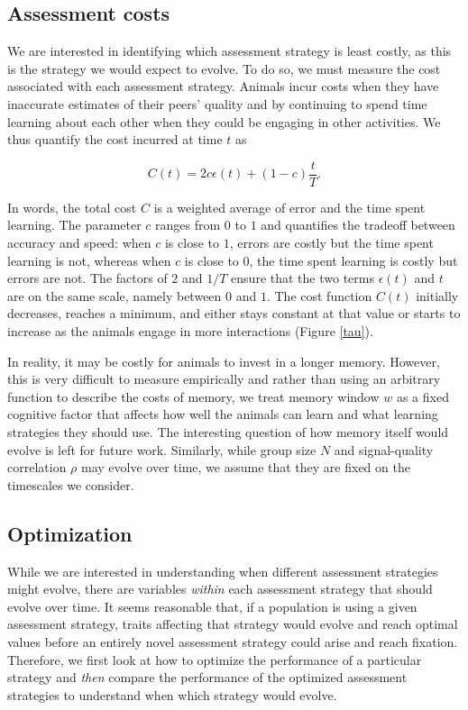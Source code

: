 \subsection{Assessment costs }
We are interested in identifying which assessment strategy is least costly, as this is the strategy we would expect to evolve. To do so, we must measure the cost associated with each assessment strategy. Animals incur costs when they have inaccurate estimates of their peers' quality and by continuing to spend time learning about each other when they could be engaging in other activities. We thus quantify the cost incurred at time $t$ as 
\begin{linenomath*}
\begin{equation*}
C(t) = 2c\epsilon(t) +(1-c)\frac{t}{T}.
\end{equation*}  
\end{linenomath*}
In words, the total cost $C$ is a weighted average of error and the time spent learning. The parameter $c$ ranges from $0$ to $1$ and quantifies the tradeoff between accuracy and speed: when $c$ is close to $1$, errors are costly but the time spent learning is not, whereas when $c$ is close to $0$, the time spent learning is costly but errors are not. The factors of $2$ and $1/T$ ensure that the two terms $\epsilon(t)$ and $t$ are on the same scale, namely between $0$ and $1$. 
The cost function $C(t)$ initially decreases, reaches a minimum, and either stays constant at that value or starts to increase as the animals engage in more interactions (Figure \ref{tau}). 

In reality, it may be costly for animals to invest in a longer memory. However, this is very difficult to measure empirically and rather than using an arbitrary function to describe the costs of memory, we treat memory window $w$ as a fixed cognitive factor that affects how well the animals can learn and what learning strategies they should use. The interesting question of how memory itself would evolve is left for future work. Similarly, while group size $N$ and signal-quality correlation $\rho$ may evolve over time, we assume that they are fixed on the timescales we consider. 


\subsection{Optimization }
While we are interested in understanding when different assessment strategies might evolve, there are variables \emph{within} each assessment strategy that should evolve over time. It seems reasonable that, if a population is using a given assessment strategy, traits affecting that strategy would evolve and reach optimal values before an entirely novel assessment strategy could arise and reach fixation. Therefore, we first look at how to optimize the performance of a particular strategy and \emph{then} compare the performance of the optimized assessment strategies to understand when which strategy would evolve. 

